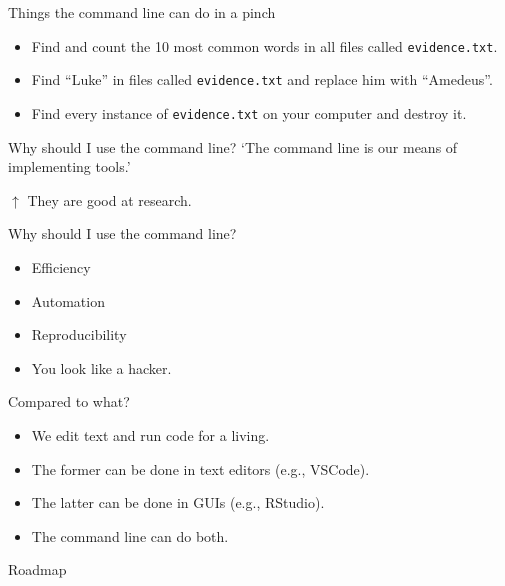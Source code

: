 \begin{frame}{Things the command line can do in a pinch}
    \stretchon
    \begin{itemize}
        \item Find and count the 10 most common words in all files
            called \texttt{evidence.txt}.
        \item Find ``Luke'' in files called \texttt{evidence.txt}
            and replace him with ``Amedeus''.
        \item Find every instance of \texttt{evidence.txt} on your computer and destroy it.
   \end{itemize}
\end{frame}

\begin{frame}{Why should I use the command line?}
`The command line is our means of implementing tools.'

\cite{gentzkowshapiromanual}

\vspace{1cm}

$\uparrow$ They are good at research.
\end{frame}

\begin{frame}{Why should I use the command line?}
\stretchon
\begin{itemize}
    \item Efficiency
    \item Automation
    \item Reproducibility
    \item You look like a hacker.
\end{itemize}
\end{frame}


\begingroup
\large
\begin{frame}{Compared to what?}
\stretchon
    \begin{itemize}
        \item[] We edit text and run code for a living.
        \item[] The former can be done in text editors (e.g., VSCode).
        \item[] The latter can be done in GUIs (e.g., RStudio).
        \item[] The command line can do both.
    \end{itemize}
\end{frame}
\endgroup

\begin{frame}{Roadmap}
\stretchon
    \tableofcontents
\end{frame}
